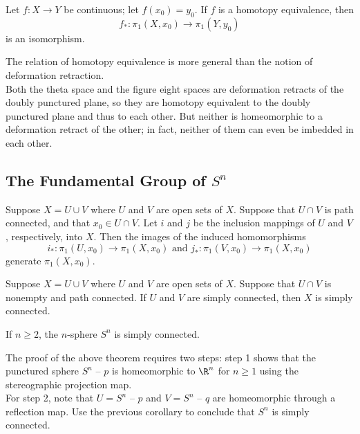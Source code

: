 \begin{theorem}
Let $f\colon X \rightarrow Y$ be continuous; let $f(x_0) = y_0$. If $f$ is a homotopy equivalence, then
\[
    f_{\ast} \colon \pi _1(X, x_0) \rightarrow \pi _1(Y, y_0)
\]
is an isomorphism.
\end{theorem}

\begin{remark}
The relation of homotopy equivalence is more general than the notion of deformation retraction. \\

Both the theta space and the figure eight spaces are deformation retracts of the doubly punctured plane, so they are homotopy equivalent to the doubly punctured plane and thus to each other. But neither is homeomorphic to a deformation retract of the other; in fact, neither of them can even be imbedded in each other. 
\end{remark}

\subsection{The Fundamental Group of $S^n$}

\begin{theorem}
Suppose $X = U \cup V$ where $U$ and $V$ are open sets of $X$. Suppose that $U \cap V$ is path connected, and that $x_0 \in U \cap V$. Let $i$ and $j$ be the inclusion mappings of $U$ and $V$, respectively, into $X$. 
Then the images of the induced homomorphisms
\[
    i_{\ast} \colon \pi_1(U, x_0) \rightarrow \pi_1(X, x_0) \text{ and } j_{\ast} \colon \pi_1(V, x_0) \rightarrow \pi_1(X, x_0)
\]
generate $\pi_1(X, x_0)$.
\end{theorem}

\begin{corollary}
Suppose $X = U \cup V$ where $U$ and $V$ are open sets of $X$. Suppose that $U \cap V$ is nonempty and path connected. If $U$ and $V$ are simply connected, then $X$ is simply connected.
\end{corollary}

\begin{theorem}
If $n \geq 2$, the $n$-sphere $S^n$ is simply connected.
\end{theorem}

\begin{remark}
The proof of the above theorem requires two steps: step 1 shows that the punctured sphere $S^n \text{ -- } p$ is homeomorphic to $\R^n$ for $n \geq 1$ using the stereographic projection map. \\

For step 2, note that $U = S^n \text{ -- } p$ and  $V = S^n \text{ -- } q$ are homeomorphic through a reflection map. Use the previous corollary to conclude that $S^n$ is simply connected.
\end{remark}

